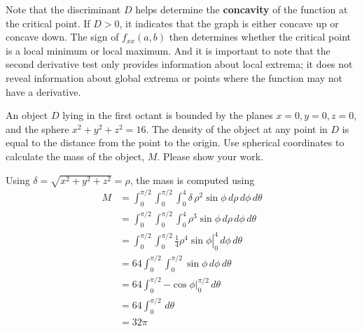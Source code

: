 {\begin{center}
 \end{center} 
    Note that the discriminant \( D \) helps determine the \textbf{concavity} of the function at the critical point. If \( D > 0 \), it indicates that the graph is either concave up or concave down. The sign of \( f_{xx}(a, b) \) then determines whether the critical point is a local minimum or local maximum. And it is important to note that the second derivative test only provides information about local extrema; it does not reveal information about global extrema or points where the function may not have a derivative.    
}
\else 
      \vspace{5cm}
\fi
    
\fi

% 
\ifnum {}
\question[4] An object $D$ lying in the first octant is bounded by the planes $x=0, y=0, z=0$, and the sphere $x^2+y^2 + z^2 = 16$. The density of the object at any point in $D$ is equal to the distance from the point to the origin. Use spherical coordinates to calculate the mass of the object, $M$. Please show your work. 
    
    \ifnum {} {\color{DarkBlue} Using $\delta = \sqrt{x^2+y^2+z^2} = \rho$, the mass is computed using 
    \begin{align}
        M &= \int_0^{\pi/2} \int_0^{\pi/2} \int_0^4 \delta \, \rho^2\sin\phi \, d\rho\,d\phi\,d\theta \\
        &= \int_0^{\pi/2} \int_0^{\pi/2} \int_0^4 \rho^3\sin\phi \, d\rho\,d\phi\,d\theta \\
        &= \int_0^{\pi/2} \int_0^{\pi/2} \left. \frac14 \rho^4\sin\phi \right|_0^4 \, d\phi\,d\theta \\
        &= 64 \int_0^{\pi/2} \int_0^{\pi/2} \sin\phi \, d\phi\,d\theta \\
        &= 64 \int_0^{\pi/2} \left. -\cos\phi \right|_0^{\pi/2} \, d\theta \\
        &= 64 \int_0^{\pi/2}  \, d\theta \\
        &= 32\pi
    \end{align}
    
    } 
   \else
      \vspace{14cm}
   \fi    

